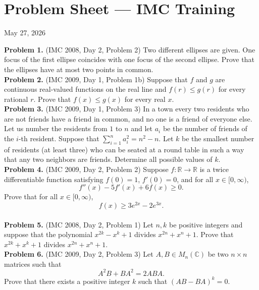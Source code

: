 \documentclass{article}
\newcommand{\R}{\mathbb{R}}
\newcommand{\C}{\mathbb{C}}
\begin{document}
\pagestyle{plain}

\section*{Problem Sheet --- IMC Training}

\begin{center}
May 27, 2026
\end{center}

\textbf{Problem 1.} (IMC 2008, Day 2, Problem 2)
Two different ellipses are given. One focus of the first ellipse coincides with one focus of the second ellipse.
Prove that the ellipses have at most two points in common.
\\

\textbf{Problem 2.} (IMC 2009, Day 1, Problem 1b)
Suppose that \( f \) and \( g \) are continuous real-valued functions on the real line and \( f(r) \leq g(r) \) for every rational \( r \).
Prove that \( f(x) \leq g(x) \) for every real \( x \).
\\

\textbf{Problem 3.} (IMC 2009, Day 1, Problem 3)
In a town every two residents who are not friends have a friend in common, and no one is a friend of everyone else.
Let us number the residents from \( 1 \) to \( n \) and let \( a_i \) be the number of friends of the \( i \)-th resident.
Suppose that
\(
\sum_{i=1}^{n} a_i^2 = n^2 - n.
\)
Let \( k \) be the smallest number of residents (at least three) who can be seated at a round table in such a way that any two neighbors are friends.
Determine all possible values of \( k \).
\\

\textbf{Problem 4.} (IMC 2009, Day 2, Problem 2)
Suppose \( f : \R \to \R \) is a twice differentiable function satisfying \( f(0) = 1 \), \( f'(0) = 0 \), and for all \( x \in [0, \infty) \),
\[
f''(x) - 5 f'(x) + 6 f(x) \geq 0.
\]
Prove that for all \( x \in [0, \infty) \),
\[
f(x) \geq 3 e^{2x} - 2 e^{3x}.
\]
\\

\textbf{Problem 5.} (IMC 2008, Day 2, Problem 1)
Let \( n, k \) be positive integers and suppose that the polynomial \( x^{2k} - x^k + 1 \) divides \( x^{2n} + x^n + 1 \).
Prove that \( x^{2k} + x^k + 1 \) divides \( x^{2n} + x^n + 1 \).
\\

\textbf{Problem 6.} (IMC 2009, Day 2, Problem 3)
Let \( A, B \in M_n(\C) \) be two \( n \times n \) matrices such that
\[
A^2 B + B A^2 = 2 A B A.
\]
Prove that there exists a positive integer \( k \) such that \( (AB - BA)^k = 0 \).
\\
\end{document}
